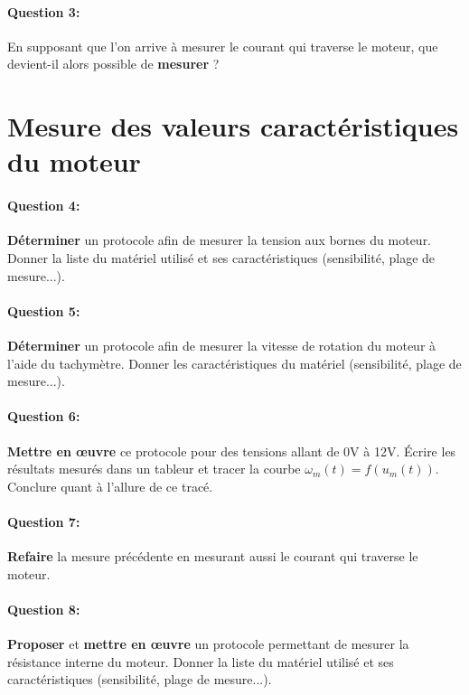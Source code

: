\paragraph{Question 3:} En supposant que l'on arrive à mesurer le courant qui traverse le moteur, que devient-il alors possible de \textbf{mesurer} ?

\newpage

\section{Mesure des valeurs caractéristiques du moteur} 

\paragraph{Question 4:} \textbf{Déterminer} un protocole afin de mesurer la tension aux bornes du moteur. Donner la liste du matériel utilisé et ses caractéristiques (sensibilité, plage de mesure...).

\paragraph{Question 5:} \textbf{Déterminer} un protocole afin de mesurer la vitesse de rotation du moteur à l'aide du tachymètre. Donner les caractéristiques du matériel (sensibilité, plage de mesure...).

\paragraph{Question 6:} \textbf{Mettre en \oe uvre} ce protocole pour des tensions allant de 0V à 12V. Écrire les résultats mesurés dans un tableur et tracer la courbe $\omega_m(t)=f(u_m(t))$. Conclure quant à l'allure de ce tracé.

\paragraph{Question 7:} \textbf{Refaire} la mesure précédente en mesurant aussi le courant qui traverse le moteur.

\paragraph{Question 8:} \textbf{Proposer} et \textbf{mettre en \oe uvre} un protocole permettant de mesurer la résistance interne du moteur. Donner la liste du matériel utilisé et ses caractéristiques (sensibilité, plage de mesure...).

